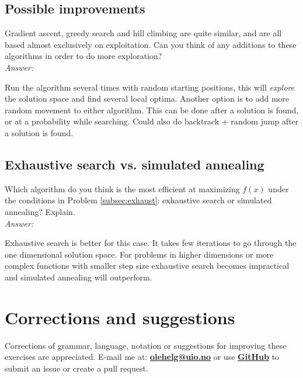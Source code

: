 \documentclass{article}           %
\begin{document}
\subsection{Possible improvements}
Gradient ascent, greedy search and hill climbing are quite similar, and are
all based almost exclusively on exploitation. Can you think of any additions
to these algorithms in order to do more exploration?\\

\emph{Answer:}

Run the algorithm several times with random starting positions, this will
\emph{explore} the solution space and find several local optima. Another option
is to add more random movement to either algorithm. This can be done after a
solution is found, or at a probability while searching. Could also do backtrack
+ random jump after a solution is found.

\subsection{Exhaustive search vs. simulated annealing}
Which algorithm do you think is the most efficient at maximizing \(f(x)\) under
the conditions in Problem \ref{subsec:exhaust}: exhaustive search or simulated annealing?
Explain.\\

\emph{Answer:}

Exhaustive search is better for this case. It takes few iterations to go
through the one dimensional solution space. For problems in higher dimensions
or more complex functions with smaller step size exhaustive search becomes
impractical and simulated annealing will outperform.

\section*{Corrections and suggestions}
Corrections of grammar, language, notation or suggestions for improving these exercises are appreciated.
E-mail me at: \href{mailto:olehelg@uio.no}{\textbf{olehelg@uio.no}} or use
\href{https://github.com/olehermanse/INF3490-AI_Machine_Learning}{\textbf{GitHub}}
to submit an issue or create a pull request.
\end{document}
